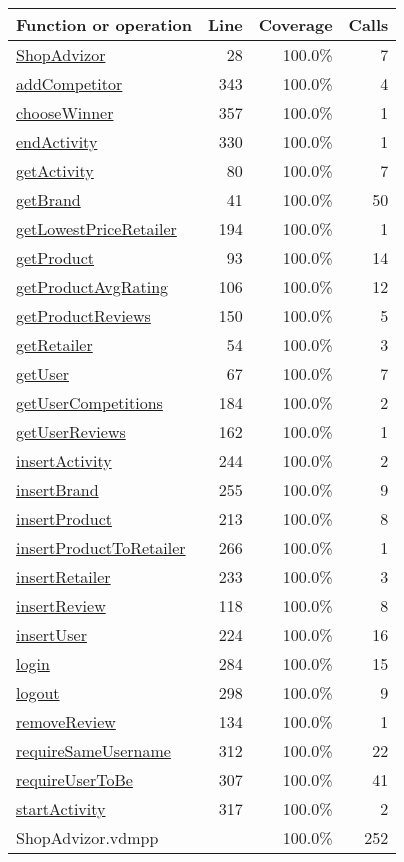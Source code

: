 \begin{longtable}{|l|r|r|r|}
\hline
Function or operation & Line & Coverage & Calls \\
\hline
\hline
\hyperref[ShopAdvizor:28]{ShopAdvizor} & 28&100.0\% & 7 \\
\hline
\hyperref[addCompetitor:343]{addCompetitor} & 343&100.0\% & 4 \\
\hline
\hyperref[chooseWinner:357]{chooseWinner} & 357&100.0\% & 1 \\
\hline
\hyperref[endActivity:330]{endActivity} & 330&100.0\% & 1 \\
\hline
\hyperref[getActivity:80]{getActivity} & 80&100.0\% & 7 \\
\hline
\hyperref[getBrand:41]{getBrand} & 41&100.0\% & 50 \\
\hline
\hyperref[getLowestPriceRetailer:194]{getLowestPriceRetailer} & 194&100.0\% & 1 \\
\hline
\hyperref[getProduct:93]{getProduct} & 93&100.0\% & 14 \\
\hline
\hyperref[getProductAvgRating:106]{getProductAvgRating} & 106&100.0\% & 12 \\
\hline
\hyperref[getProductReviews:150]{getProductReviews} & 150&100.0\% & 5 \\
\hline
\hyperref[getRetailer:54]{getRetailer} & 54&100.0\% & 3 \\
\hline
\hyperref[getUser:67]{getUser} & 67&100.0\% & 7 \\
\hline
\hyperref[getUserCompetitions:184]{getUserCompetitions} & 184&100.0\% & 2 \\
\hline
\hyperref[getUserReviews:162]{getUserReviews} & 162&100.0\% & 1 \\
\hline
\hyperref[insertActivity:244]{insertActivity} & 244&100.0\% & 2 \\
\hline
\hyperref[insertBrand:255]{insertBrand} & 255&100.0\% & 9 \\
\hline
\hyperref[insertProduct:213]{insertProduct} & 213&100.0\% & 8 \\
\hline
\hyperref[insertProductToRetailer:266]{insertProductToRetailer} & 266&100.0\% & 1 \\
\hline
\hyperref[insertRetailer:233]{insertRetailer} & 233&100.0\% & 3 \\
\hline
\hyperref[insertReview:118]{insertReview} & 118&100.0\% & 8 \\
\hline
\hyperref[insertUser:224]{insertUser} & 224&100.0\% & 16 \\
\hline
\hyperref[login:284]{login} & 284&100.0\% & 15 \\
\hline
\hyperref[logout:298]{logout} & 298&100.0\% & 9 \\
\hline
\hyperref[removeReview:134]{removeReview} & 134&100.0\% & 1 \\
\hline
\hyperref[requireSameUsername:312]{requireSameUsername} & 312&100.0\% & 22 \\
\hline
\hyperref[requireUserToBe:307]{requireUserToBe} & 307&100.0\% & 41 \\
\hline
\hyperref[startActivity:317]{startActivity} & 317&100.0\% & 2 \\
\hline
\hline
ShopAdvizor.vdmpp & & 100.0\% & 252 \\
\hline
\end{longtable}


